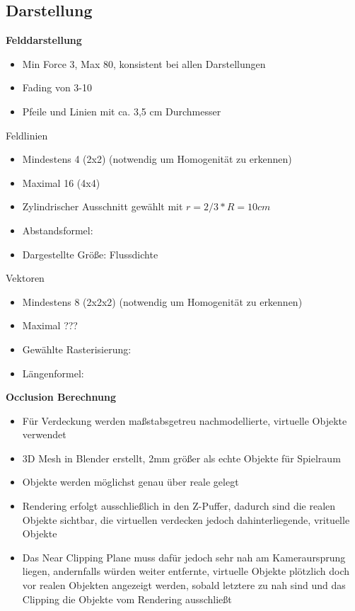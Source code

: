 \subsection{Darstellung}
\textbf{Felddarstellung}
\begin{itemize}
	\item Min Force 3, Max 80, konsistent bei allen Darstellungen
	\item Fading von 3-10
	\item Pfeile und Linien mit ca. 3,5 cm Durchmesser
\end{itemize}
Feldlinien
\begin{itemize}
	\item Mindestens 4 (2x2) (notwendig um Homogenität zu erkennen)
	\item Maximal 16 (4x4)
	\item Zylindrischer Ausschnitt gewählt mit $r=2/3 * R = 10 cm$
	\item Abstandsformel: 
	\item Dargestellte Größe: Flussdichte
\end{itemize}
Vektoren
\begin{itemize}
	\item Mindestens 8 (2x2x2) (notwendig um Homogenität zu erkennen)
	\item Maximal ???
	\item Gewählte Rasterisierung:
	\item Längenformel:
\end{itemize}

\textbf{Occlusion Berechnung}
\begin{itemize}
	\item Für Verdeckung werden maßstabsgetreu nachmodellierte, virtuelle Objekte verwendet
	\item 3D Mesh in Blender erstellt, 2mm größer als echte Objekte für Spielraum
	\item Objekte werden möglichst genau über reale gelegt
	\item Rendering erfolgt ausschließlich in den Z-Puffer, dadurch sind die realen Objekte sichtbar, die virtuellen verdecken jedoch dahinterliegende, vrituelle Objekte
	\item Das Near Clipping Plane muss dafür jedoch sehr nah am Kameraursprung liegen, andernfalls würden weiter entfernte, virtuelle Objekte plötzlich doch vor realen Objekten angezeigt werden, sobald letztere zu nah sind und das Clipping die Objekte vom Rendering ausschließt
\end{itemize}

